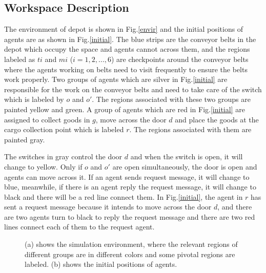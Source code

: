 \documentclass[journal]{IEEEtran}
\begin{document}
\subsection{Workspace Description}
The environment of depot is shown in Fig.\ref{envir} and the initial positions of agents are as shown in Fig.\ref{initial}. The blue strips are the conveyor belts in the depot which occupy the space and agents cannot across them, and the regions labeled as $ti$ and $mi$ ($i=1,2,...,6$) are checkpoints around the conveyor belts where the agents working on belts need to visit frequently to ensure the belts work properly. Two groups of agents which are silver in Fig.\ref{initial} are responsible for the work on the conveyor belts and need to take care of the switch which is labeled by $o$ and $o'$. The regions associated with these two groups are painted yellow and green. A group of agents which are red in Fig.\ref{initial} are assigned to collect goods in $g$, move across the door $d$ and place the goods at the cargo collection point which is labeled $r$. The regions associated with them are painted gray.\par
The switches in gray control the door $d$ and when the switch is open, it will change to yellow. Only if $o$ and $o'$ are open simultaneously, the door is open and agents can move across it. If an agent sends request message, it will change to blue, meanwhile, if there is an agent reply the request message, it will change to black and there will be a red line connect them. In Fig.\ref{initial}, the agent in $r$ has sent a request message because it intends to move across the door $d$, and there are two agents turn to black to reply the request message and there are two red lines connect each of them to the request agent.
\begin{figure}
\centering
{}
\hspace{0.3in}
\caption{(a) shows the simulation environment, where the relevant regions of different groups are in different colors and some pivotal regions are labeled. (b) shows the initial positions of agents.}
\label{first}
\end{figure}
\end{document}
